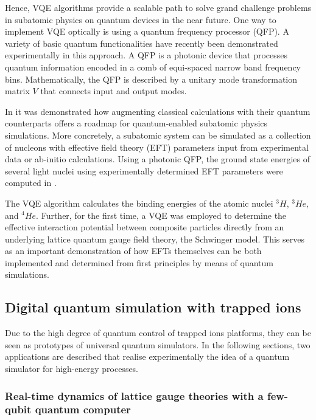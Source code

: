 \documentclass[epj,final]{svjour}
\begin{document}
Hence, VQE algorithms provide a scalable path to solve grand challenge problems in subatomic physics on quantum devices in the near future. One way to implement VQE optically is using a quantum frequency processor (QFP). A variety of basic quantum functionalities have recently been demonstrated experimentally in this approach. A QFP is a photonic device that processes quantum information encoded in a comb of equi-spaced narrow band frequency bins. Mathematically, the QFP is described by a unitary mode transformation matrix $V$ that connects input and output modes. 

In \cite{lu2018simulations} it was demonstrated how augmenting classical  calculations with their quantum counterparts offers a roadmap for quantum-enabled subatomic physics simulations. More concretely, a subatomic system can be simulated as a collection of nucleons with effective field theory (EFT) parameters input from experimental data or ab-initio calculations. Using a photonic QFP, the ground state energies of several light nuclei using experimentally determined EFT parameters were computed in \cite{lu2018simulations}.

The VQE algorithm calculates the binding energies of the atomic nuclei $^{3}H$, $^{3}He$, and $^{4}He$. Further, for the first time, a VQE was employed to determine the effective interaction potential between composite particles directly from an underlying lattice quantum gauge field theory, the Schwinger model. This serves as an important demonstration of how EFTs themselves can be both implemented and determined from first principles by means of quantum simulations.

\subsection{Digital quantum simulation with trapped ions}

Due to the high degree of quantum control of trapped ions platforms, they can be seen as prototypes of universal quantum simulators. In the following sections, two applications are described that realise experimentally the idea of a quantum simulator for high-energy processes. 

\subsubsection{Real-time dynamics of lattice gauge theories with a few-qubit quantum computer\cite{martinez2016real,muschik2017u}}
\end{document}
